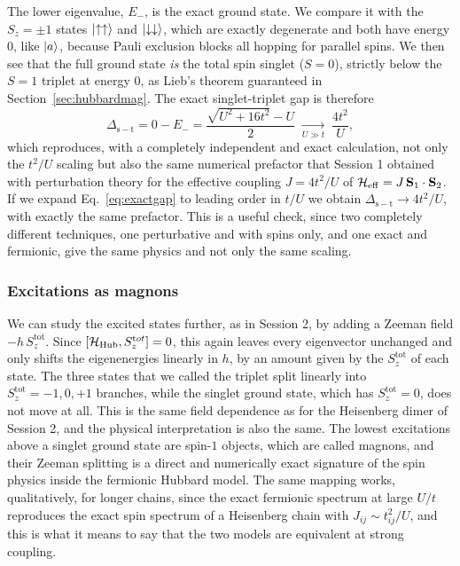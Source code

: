 \documentclass[lecture_notes.tex]{subfiles}
\begin{document}
The lower eigenvalue, $E_-$, is the exact ground state. We compare it with the $S_z=\pm1$ states
$\ket{\uparrow\uparrow}$ and $\ket{\downarrow\downarrow}$, which are exactly degenerate and both have energy $0$, like
$\ket a$, because Pauli exclusion blocks all hopping for parallel spins. We then see that the full
ground state \emph{is} the total spin singlet ($S=0$), strictly below the $S=1$ triplet at energy
$0$, as Lieb's theorem guaranteed in Section~\ref{sec:hubbardmag}. The exact singlet-triplet gap is
therefore
\begin{equation}
  \Delta_{\mathrm{s-t}} = 0 - E_- = \frac{\sqrt{U^2+16t^2} - U}{2}
  \;\xrightarrow[U\gg t]{}\; \frac{4t^2}{U},
  \label{eq:exactgap}
\end{equation}
which reproduces, with a completely independent and exact calculation, not only the $t^2/U$
scaling but also the same numerical prefactor that Session 1 obtained with perturbation theory for
the effective coupling $J=4t^2/U$ of $\mathcal{H}_{\mathrm{eff}} = J\,\vb S_1\cdot\vb S_2$. If we expand
Eq.~\eqref{eq:exactgap} to leading order in $t/U$ we obtain $\Delta_{\mathrm{s-t}}\to4t^2/U$, with
exactly the same prefactor. This is a useful check, since two completely different techniques, one
perturbative and with spins only, and one exact and fermionic, give the same physics and not only
the same scaling.

\subsubsection{Excitations as magnons}
We can study the excited states further, as in Session 2, by adding a Zeeman field $-h\,S_z^{\mathrm{tot}}$. Since $[\mathcal{H}_{\mathrm{Hub}}, S_z^{\mathrm
tot}]=0$, this again leaves every eigenvector unchanged and only shifts the eigenenergies linearly
in $h$, by an amount given by the $S_z^{\mathrm{tot}}$ of each state. The three states that we
called the triplet split linearly into $S_z^{\mathrm{tot}} = -1, 0, +1$ branches, while the singlet
ground state, which has $S_z^{\mathrm{tot}}=0$, does not move at all. This is the same field
dependence as for the Heisenberg dimer of Session 2, and the physical interpretation is also the
same. The lowest excitations above a singlet ground state are spin-$1$ objects, which are called
magnons, and their Zeeman splitting is a direct and numerically exact signature of the spin physics
inside the fermionic Hubbard model. The same mapping works, qualitatively, for longer chains, since
the exact fermionic spectrum at large $U/t$ reproduces the exact spin spectrum of a Heisenberg
chain with $J_{ij}\sim t_{ij}^2/U$, and this is what it means to say that the two models are
equivalent at strong coupling.
\end{document}
